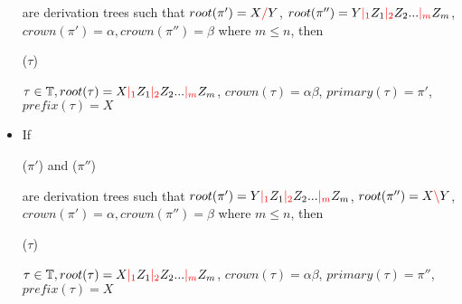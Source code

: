 \documentclass[main.tex]{subfiles}
\begin{document}
\begin{defn}
\begin{itemize}
            are derivation trees such that $ root(\pi') = X \textcolor{red}{/} Y $,
            $ root(\pi'') = Y \textcolor{red}{|_{1}} Z_1 \textcolor{red}{|_{2}} Z_2 ... \textcolor{red}{|_{m}} Z_m $,
            $ crown(\pi') = \alpha, crown(\pi'') = \beta $
            where $m \leq n$, then
            \begin{center}
                 ($\tau$)
            \end{center}
            $ \tau \in \mathbb{T}, root(\tau) = X \textcolor{red}{|_{1}} Z_1 \textcolor{red}{|_{2}} Z_2 ... \textcolor{red}{|_{m}} Z_m $,
            $ crown(\tau) = \alpha \beta $, $primary(\tau) = \pi'$, $prefix(\tau) = X$
        \item If
            \begin{center}
                 ($\pi'$)
                \quad and \quad
                 ($\pi''$)
            \end{center}
            are derivation trees such that
            $ root(\pi') = Y \textcolor{red}{|_{1}} Z_1 \textcolor{red}{|_{2}} Z_2 ... \textcolor{red}{|_{m}} Z_m $,
            $ root(\pi'') = X \textcolor{red}{\backslash} Y $,
            $ crown(\pi') = \alpha, crown(\pi'') = \beta $
            where $m \leq n$, then
            \begin{center}
                 ($\tau$)
            \end{center}
            $ \tau \in \mathbb{T}, root(\tau) = X \textcolor{red}{|_{1}} Z_1 \textcolor{red}{|_{2}} Z_2 ... \textcolor{red}{|_{m}} Z_m $,
            $ crown(\tau) = \alpha \beta $, $primary(\tau) = \pi''$, $prefix(\tau) = X$
    \end{itemize}

\end{defn}
\end{document}
